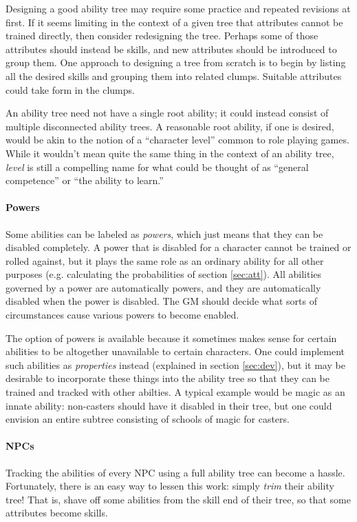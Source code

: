 \documentclass[12pt]{article}
\begin{document}
Designing a good ability tree may require some practice and repeated revisions at first.
If it seems limiting in the context of a given tree that attributes cannot be trained directly,
then consider redesigning the tree.
Perhaps some of those attributes should instead be skills, and new attributes should be
introduced to group them.
One approach to designing a tree from scratch is to begin by listing all the desired skills
and grouping them into related clumps.
Suitable attributes could take form in the clumps.

An ability tree need not have a single root ability; it could instead
consist of multiple disconnected ability trees.
A reasonable root ability, if one is desired, would be akin to the notion of a ``character level'' common to role playing games.
While it wouldn't mean quite the same thing in the context of an ability tree, \emph{level} is still a compelling name for
what could be thought of as ``general competence'' or ``the ability to learn.''

\paragraph{Powers}
Some abilities can be labeled as \emph{powers}, which just means that they can be disabled completely.
A power that is disabled for a character cannot be trained or rolled against,
but it plays the same role as an ordinary ability for all other purposes (e.g. calculating
the probabilities of section \ref{sec:att}).
All abilities governed by a power are automatically powers, and they are
automatically disabled when the power is disabled.
The GM should decide what sorts of circumstances cause various powers to become enabled.

The option of powers is available because it sometimes makes sense for certain abilities to be altogether unavailable to certain characters.
One could implement such abilities as \emph{properties} instead (explained in section \ref{sec:dev}),
but it may be desirable to incorporate these things into the ability tree so that they can be trained and tracked with other abilties.
A typical example would be magic as an innate ability:
non-casters should have it disabled in their tree, but one could envision an entire subtree consisting of schools of magic for casters.

\paragraph{NPCs}
Tracking the abilities of every NPC using a full ability tree can become a hassle.
Fortunately, there is an easy way to lessen this work: simply \emph{trim} their ability tree!
That is, shave off some abilities from the skill end of their tree, so that some attributes become skills.
\end{document}
